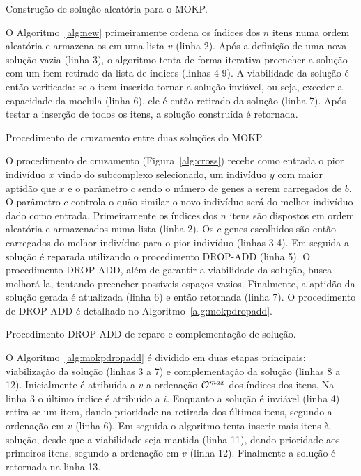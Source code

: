 \begin{algorithm}
  
  \caption{Construção de solução aleatória para o MOKP.}
  \label{alg:new}
\end{algorithm}

O Algoritmo~\ref{alg:new} primeiramente ordena
os índices dos $n$ itens numa ordem aleatória e
armazena-os em uma lista $v$ (linha 2).
Após a definição de uma nova solução vazia (linha 3), o algoritmo tenta de forma
iterativa preencher a solução com um item retirado da lista de índices (linhas 4-9).
A viabilidade da solução é então verificada: se o item inserido tornar a solução
inviável, ou seja, exceder a capacidade da mochila (linha 6), ele é então retirado
da solução (linha 7).
Após testar a inserção de todos os itens, a solução construída é retornada.

\begin{algorithm}
  
  \caption{Procedimento de cruzamento entre duas soluções do MOKP.}
  \label{alg:cross}
\end{algorithm}

O procedimento de cruzamento (Figura~\ref{alg:cross}) recebe como entrada
o pior indivíduo $x$ vindo do subcomplexo selecionado, um indivíduo $y$ com
maior aptidão que $x$ e o parâmetro $c$ sendo o número de genes a serem carregados de $b$.
O parâmetro $c$ controla o quão similar o novo indivíduo será do melhor indivíduo
dado como entrada.
Primeiramente os índices dos $n$ itens são dispostos em ordem aleatória e
armazenados numa lista (linha 2).
Os $c$ genes escolhidos são então carregados do melhor indivíduo para
o pior indivíduo (linhas 3-4).
Em seguida a solução é reparada utilizando o procedimento DROP-ADD (linha 5).
O procedimento DROP-ADD, além de garantir a viabilidade da solução,
busca melhorá-la, tentando preencher possíveis espaços vazios.
Finalmente, a aptidão da solução gerada é atualizada (linha 6) e então retornada (linha 7).
O procedimento de DROP-ADD é detalhado no Algoritmo~\ref{alg:mokpdropadd}.

\begin{algorithm}
  
  \caption{Procedimento DROP-ADD de reparo e complementação de solução.}
  \label{alg:mokpdropadd}
\end{algorithm}

O Algoritmo~\ref{alg:mokpdropadd} é dividido em duas etapas principais:
viabilização da solução (linhas 3 a 7) e complementação da solução (linhas 8 a 12).
Inicialmente é atribuída a $v$ a ordenação $\mathcal{O}^{max}$ dos índices dos itens.
Na linha 3 o último índice é atribuído a $i$.
Enquanto a solução é inviável (linha 4) retira-se um item, dando prioridade na retirada dos
últimos itens, segundo a ordenação em $v$ (linha 6).
Em seguida o algoritmo tenta inserir mais itens à solução, desde que a viabilidade seja
mantida (linha 11), dando prioridade aos primeiros itens, segundo a ordenação em $v$ (linha 12).
Finalmente a solução é retornada na linha 13.

